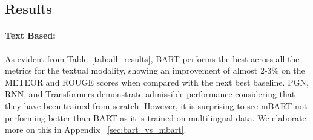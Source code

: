 \documentclass[11pt]{article}
\begin{document}
\subsection{Results}
\paragraph{Text Based:} As evident from Table~\ref{tab:all_results}, BART performs the best across all the metrics for the textual modality, showing an improvement of almost $2$-$3\%$ on the METEOR and ROUGE scores when compared with the next best baseline. PGN, RNN, and Transformers demonstrate admissible performance considering that they have been trained from scratch. However, it is surprising to see mBART not performing better than BART as it is trained on multilingual data.  We elaborate more on this in Appendix ~\ref{sec:bart_vs_mbart}. 
\end{document}
